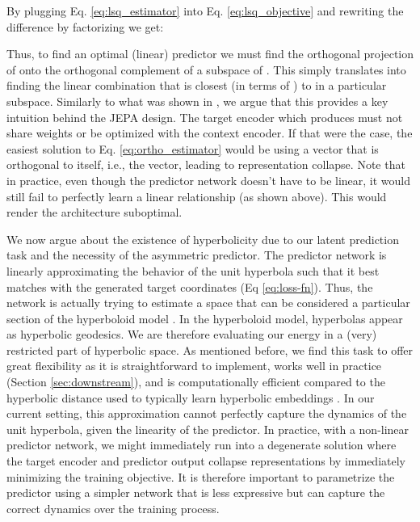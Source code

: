 \documentclass{article} \usepackage{iclr2024_conference,times}
\begin{document}
By plugging Eq. \ref{eq:lsq_estimator} into Eq. \ref{eq:lsq_objective} and rewriting the difference by factorizing  we get:

Thus, to find an optimal (linear) predictor we must find the orthogonal projection of  onto the orthogonal complement of a subspace of . This simply translates into finding the linear combination that is closest (in terms of ) to  in a particular subspace. Similarly to what was shown in \citet{richemond2023edge}, we argue that this provides a key intuition behind the JEPA design. The target encoder which produces  must not share weights or be optimized with the context encoder. If that were the case, the easiest solution to Eq. \ref{eq:ortho_estimator} would be using a vector that is orthogonal to itself, i.e., the  vector, leading to representation collapse. Note that in practice, even though the predictor network doesn't have to be linear, it would still fail to perfectly learn a linear relationship (as shown above). This would render the architecture suboptimal. 

We now argue about the existence of hyperbolicity due to our latent prediction task and the necessity of the asymmetric predictor. The predictor network is linearly approximating the behavior of the unit hyperbola such that it best matches with the generated target coordinates (Eq \ref{eq:loss-fn}). Thus, the network is actually trying to estimate a space that can be considered a particular section of the hyperboloid model \citep{reynolds1993hyperbolic}. In the hyperboloid model, hyperbolas appear as hyperbolic geodesics. We are therefore evaluating our energy in a (very) restricted part of hyperbolic space. As mentioned before, we find this task to offer great flexibility as it is straightforward to implement, works well in practice (Section \ref{sec:downstream}), and is computationally efficient compared to the hyperbolic distance used to typically learn hyperbolic embeddings \citep{nickel2017poincare}. In our current setting, this approximation cannot perfectly capture the dynamics of the unit hyperbola, given the linearity of the predictor. In practice, with a non-linear predictor network, we might immediately run into a degenerate solution where the target encoder and predictor output collapse representations by immediately minimizing the training objective. It is therefore important to parametrize the predictor using a simpler network that is less expressive but can capture the correct dynamics over the training process.
\end{document}

